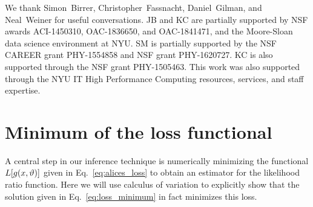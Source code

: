 \documentclass[twocolumn]{aastex62}
\begin{document}
We thank Simon~Birrer, Christopher~Fassnacht, Daniel~Gilman, and Neal~Weiner for useful conversations. JB and KC are partially supported by NSF awards ACI-1450310, OAC-1836650, and OAC-1841471, and the Moore-Sloan data science environment at NYU. SM is partially supported by the NSF CAREER grant PHY-1554858 and NSF grant PHY-1620727. KC is also supported through the NSF grant PHY-1505463. This work was also supported through the NYU IT High Performance Computing resources, services, and staff expertise.



\appendix
\section{Minimum of the loss functional}
\label{app:variation}

A central step in our inference technique is numerically minimizing the functional $L[g(x, \vartheta)]$ given in Eq.~\eqref{eq:alices_loss} to obtain an estimator for the likelihood ratio function. Here we will use calculus of variation to explicitly show that the solution given in Eq.~\eqref{eq:loss_minimum} in fact minimizes this loss.
\end{document}
